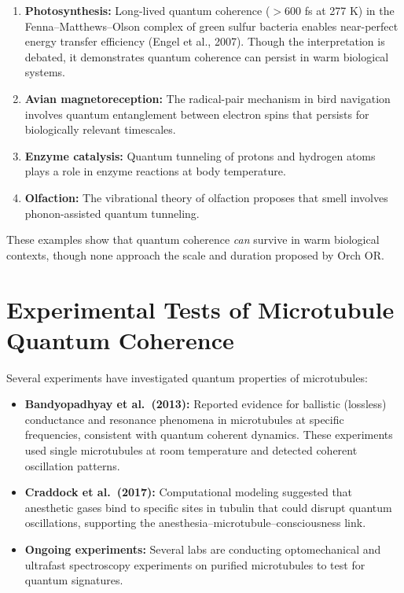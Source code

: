 \documentclass[11pt,a4paper]{report}
\begin{document}
\begin{predbox}
\begin{enumerate}[leftmargin=1.5em]
  \item \textbf{Photosynthesis:} Long-lived quantum coherence ($>$600 fs at 277 K) in the Fenna--Matthews--Olson complex of green sulfur bacteria enables near-perfect energy transfer efficiency (Engel et al., 2007). Though the interpretation is debated, it demonstrates quantum coherence can persist in warm biological systems.
  \item \textbf{Avian magnetoreception:} The radical-pair mechanism in bird navigation involves quantum entanglement between electron spins that persists for biologically relevant timescales.
  \item \textbf{Enzyme catalysis:} Quantum tunneling of protons and hydrogen atoms plays a role in enzyme reactions at body temperature.
  \item \textbf{Olfaction:} The vibrational theory of olfaction proposes that smell involves phonon-assisted quantum tunneling.
\end{enumerate}
These examples show that quantum coherence \emph{can} survive in warm biological contexts, though none approach the scale and duration proposed by Orch OR.
\end{predbox}

\section{Experimental Tests of Microtubule Quantum Coherence}

Several experiments have investigated quantum properties of microtubules:

\begin{itemize}[leftmargin=1.5em]
  \item \textbf{Bandyopadhyay et al.\ (2013):} Reported evidence for ballistic (lossless) conductance and resonance phenomena in microtubules at specific frequencies, consistent with quantum coherent dynamics. These experiments used single microtubules at room temperature and detected coherent oscillation patterns.
  \item \textbf{Craddock et al.\ (2017):} Computational modeling suggested that anesthetic gases bind to specific sites in tubulin that could disrupt quantum oscillations, supporting the anesthesia--microtubule--consciousness link.
  \item \textbf{Ongoing experiments:} Several labs are conducting optomechanical and ultrafast spectroscopy experiments on purified microtubules to test for quantum signatures.
\end{itemize}
\end{document}
